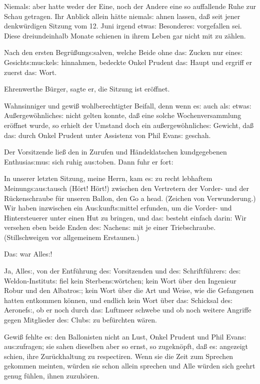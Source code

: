 \documentclass[oneside,12pt]{book}
\newenvironment{antiqua}{\normalfont}{}
\newcommand{\s}{s:}
\begin{document}
Niemal{\s} aber hatte weder der Eine, noch der Andere eine so
auf\/fallende Ruhe zur Schau getragen. Ihr Anblick allein h\"atte
niemal{\s} ahnen lassen, da{\ss} seit jener denkw\"urdigen Sitzung
vom 12. Juni irgend etwa{\s} Besondere{\s} vorgefallen sei. Diese
dreiundeinhalb Monate schienen in ihrem Leben gar nicht mit zu
z\"ahlen.

Nach den ersten Begr\"u{\ss}ung{\s}salven, welche Beide ohne da{\s}
Zucken nur eine{\s} Gesicht{\s}mu{\s}kel{\s} hinnahmen, bedeckte
Onkel Prudent da{\s} Haupt und ergriff er zuerst da{\s} Wort.

{\glqq}Ehrenwerthe B\"urger, sagte er, die Sitzung ist
er\"offnet.{\grqq}

Wahnsinniger und gewi{\ss} wohlberechtigter Beifall, denn wenn e{\s}
auch al{\s} etwa{\s} Au{\ss}ergew\"ohnliche{\s} nicht gelten konnte,
da{\ss} eine solche Wochenversammlung er\"offnet wurde, so erhielt
der Umstand doch ein au{\ss}ergew\"ohnliche{\s} Gewicht, da{\ss}
da{\s} durch Onkel Prudent unter Assistenz von Phil Evan{\s} geschah.

Der Vorsitzende lie{\ss} den in Zurufen und H\"andeklatschen
kundgegebenen Enthusia{\s}mu{\s} sich ruhig au{\s}toben. Dann fuhr er
fort:

{\glqq}In unserer letzten Sitzung, meine Herrn, kam e{\s} zu recht
lebhaftem Meinung{\s}au{\s}tausch (H\"ort! H\"ort!) zwischen den
Vertretern der Vorder- und der R\"uckenschraube f\"ur unseren Ballon,
den \begin{antiqua}Go a head\end{antiqua}. (Zeichen von
Verwunderung.) Wir haben inzwischen ein Au{\s}kunft{\s}mittel
erfunden, um die Vorder- und Hintersteuerer unter einen Hut zu
bringen, und da{\s} besteht einfach darin: Wir versehen eben beide
Enden de{\s} Nachen{\s} mit je einer Triebschraube.{\grqq}
(Stillschweigen vor allgemeinem Erstaunen.)

Da{\s} war Alle{\s}!

Ja, Alle{\s}, von der Entf\"uhrung de{\s} Vorsitzenden und de{\s}
Schriftf\"uhrer{\s} de{\s} Weldon-Institut{\s} fiel kein
Sterben{\s}w\"ortchen; kein Wort \"uber den Ingenieur Robur und den
{\glqq}Albatro{\s}{\grqq}; kein Wort \"uber die Art und Weise, wie
die Gefangenen hatten entkommen k\"onnen, und endlich kein Wort
\"uber da{\s} Schicksal de{\s} Aeronef{\s}, ob er noch durch da{\s}
Luftmeer schwebe und ob noch weitere Angriffe gegen Mitglieder de{\s}
Club{\s} zu bef\"urchten w\"aren.

Gewi{\ss} fehlte e{\s} den Ballonisten nicht an Lust, Onkel Prudent
und Phil Evan{\s} au{\s}zufragen; sie sahen dieselben aber so ernst,
so zugekn\"opft, da{\ss} e{\s} angezeigt schien, ihre Zur\"uckhaltung
zu respectiren. Wenn sie die Zeit zum Sprechen gekommen meinten,
w\"urden sie schon allein sprechen und Alle w\"urden sich geehrt
genug f\"uhlen, ihnen zuzuh\"oren.
\end{document}
